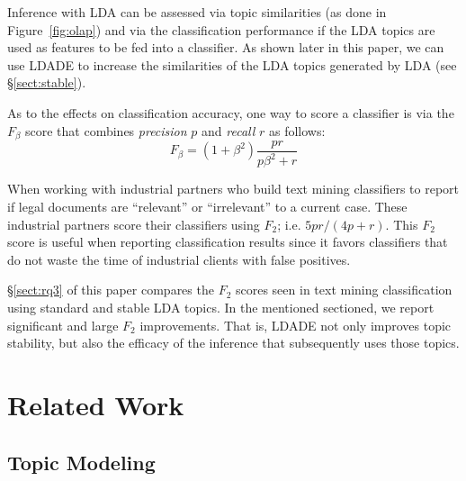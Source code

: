\documentclass[twocolumn,5p,sort&compress]{elsarticle}
\newcommand{\tion}[1]{{\S}\ref{sect:#1}}
\newcommand{\fig}[1]{Figure~\ref{fig:#1}}
\theoremstyle{break}
\begin{document}
Inference with LDA can be assessed via topic similarities (as done in \fig{olap}) and via the classification performance if the LDA topics are used as features to be fed into a classifier. As shown later in this paper, we can use LDADE to increase the similarities of the LDA
topics generated by LDA (see \tion{stable}).

As to the effects on classification accuracy, 
one way to score a classifier is via the $F_\beta$ score that combines
{\em precision} $p$ and {\em recall} $r$ as follows:
\begin{equation}\label{eq:f}
F_{\beta} = (1+\beta^2) \frac{pr}{p\beta^2 + r}
\end{equation}

When working with industrial partners who build
text mining
 classifiers to report if legal documents are
``relevant'' or ``irrelevant'' to a current case.
These industrial partners score their classifiers using   $F_2$; i.e.
\mbox{$5pr/(4p + r)$}. This $F_2$ score is useful when reporting classification results
since it favors classifiers that do not waste the time of industrial clients with false positives.

\tion{rq3} of this paper compares the $F_2$ scores seen in text mining classification using standard and stable LDA topics.
In the mentioned sectioned, we report 
significant and large
$F_2$ improvements. That is, LDADE not only improves topic stability, but also the efficacy
of the inference that subsequently uses those topics.
\section{Related Work}
\label{sect:related}

\subsection{Topic Modeling}\label{sect:tm}
\end{document}
